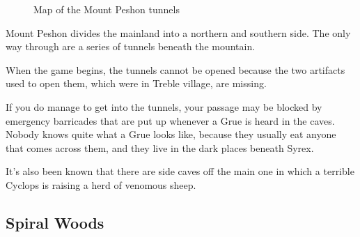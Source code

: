 \documentclass[10pt,twocolumn]{memoir}
\begin{document}
\begin{figure}[ht]
  \begin{center}
  \end{center}
  \caption{Map of the Mount Peshon tunnels}
\end{figure}

Mount Peshon  divides the mainland into  a northern and southern  side. The only
way through are a series of tunnels beneath the mountain.

When the  game begins, the  tunnels cannot be  opened because the  two artifacts
used to open them, which were in Treble village, are missing.

If  you do  manage to  get into  the  tunnels, your  passage may  be blocked  by
emergency barricades  that are  put up whenever  a Grue is  heard in  the caves.
Nobody knows quite what a Grue looks  like, because they usually eat anyone that
comes across them, and they live in the dark places beneath Syrex.

It's  also been  known that  there are  side  caves off  the main  one in  which
a terrible Cyclops is raising a herd of venomous sheep.

\subsection{Spiral Woods}
\end{document}
